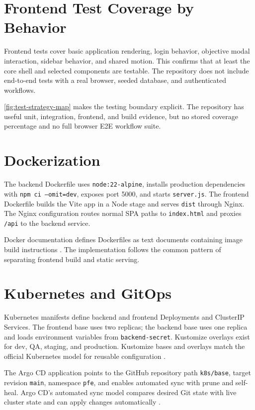 \section{Frontend Test Coverage by Behavior}
Frontend tests cover basic application rendering, login behavior, objective modal interaction, sidebar behavior, and shared motion. This confirms that at least the core shell and selected components are testable. The repository does not include end-to-end tests with a real browser, seeded database, and authenticated workflows.



\cref{fig:test-strategy-map} makes the testing boundary explicit. The repository has useful unit, integration, frontend, and build evidence, but no stored coverage percentage and no full browser E2E workflow suite.

\section{Dockerization}
The backend Dockerfile uses \texttt{node:22-alpine}, installs production dependencies with \texttt{npm ci --omit=dev}, exposes port 5000, and starts \texttt{server.js}. The frontend Dockerfile builds the Vite app in a Node stage and serves \texttt{dist} through Nginx. The Nginx configuration routes normal SPA paths to \texttt{index.html} and proxies \texttt{/api} to the backend service.

Docker documentation defines Dockerfiles as text documents containing image build instructions \cite{dockerDocs}. The implementation follows the common pattern of separating frontend build and static serving.

\section{Kubernetes and GitOps}
Kubernetes manifests define backend and frontend Deployments and ClusterIP Services. The frontend base uses two replicas; the backend base uses one replica and loads environment variables from \texttt{backend-secret}. Kustomize overlays exist for dev, QA, staging, and production. Kustomize bases and overlays match the official Kubernetes model for reusable configuration \cite{kustomizeDocs}.

The Argo CD application points to the GitHub repository path \texttt{k8s/base}, target revision \texttt{main}, namespace \texttt{pfe}, and enables automated sync with prune and self-heal. Argo CD's automated sync model compares desired Git state with live cluster state and can apply changes automatically \cite{argoDocs}.

